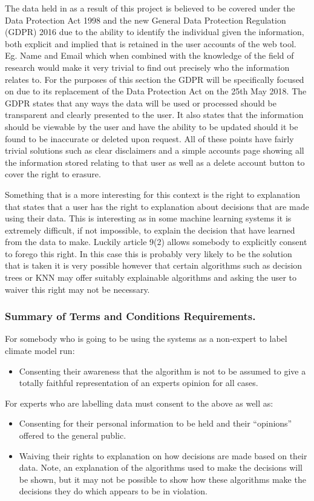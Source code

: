 \documentclass[11pt]{article} %
\numberwithin{equation}{section}
\begin{document}
The data held in as a result of this project is believed to be covered
under the Data Protection Act 1998 and the new General Data Protection
Regulation (GDPR) 2016 due to the ability to identify the individual
given the information, both explicit and implied that is retained in
the user accounts of the web tool. Eg. Name and Email which when combined
with the knowledge of the field of research would make it very trivial
to find out precisely who the information relates to. For the purposes
of this section the GDPR will be specifically focused on due to its
replacement of the Data Protection Act on the 25th May 2018. The GDPR
states that any ways the data will be used or processed should be
transparent and clearly presented to the user. It also states that
the information should be viewable by the user and have the ability
to be updated should it be found to be inaccurate or deleted upon
request. All of these points have fairly trivial solutions such as
clear disclaimers and a simple accounts page showing all the information
stored relating to that user as well as a delete account button to
cover the right to erasure. 

Something that is a more interesting for this context is the right
to explanation that states that a user has the right to explanation
about decisions that are made using their data. This is interesting
as in some machine learning systems it is extremely difficult, if
not impossible, to explain the decision that have learned from the
data to make. Luckily article 9(2) allows somebody to explicitly consent
to forego this right. In this case this is probably very likely to
be the solution that is taken it is very possible however that certain
algorithms such as decision trees or KNN may offer suitably explainable
algorithms and asking the user to waiver this right may not be necessary. 

\subsubsection{Summary of Terms and Conditions Requirements.}

For somebody who is going to be using the systems as a non-expert
to label climate model run:
\begin{itemize}
\item Consenting their awareness that the algorithm is not to be assumed
to give a totally faithful representation of an experts opinion for
all cases.
\end{itemize}
For experts who are labelling data must consent to the above as well
as:
\begin{itemize}
\item Consenting for their personal information to be held and their ``opinions''
offered to the general public.
\item Waiving their rights to explanation on how decisions are made based
on their data. Note, an explanation of the algorithms used to make
the decisions will be shown, but it may not be possible to show how
these algorithms make the decisions they do which appears to be in
violation.
\end{itemize}
\end{document}

